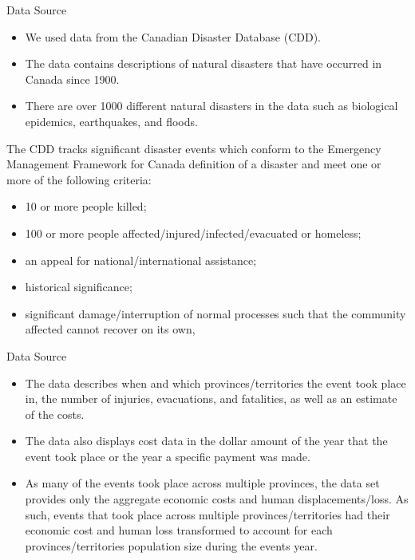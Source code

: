 \begin{frame}{Data Source}
\begin{itemize}
	\item We used data from the Canadian Disaster Database (CDD).  
	\item The data contains descriptions of natural disasters that have occurred in Canada since 1900. 
	\item There are over 1000 different natural disasters in the data such as biological epidemics, earthquakes, and floods.
\end{itemize}
The CDD tracks significant disaster events which conform to the Emergency Management Framework for Canada definition of a disaster and meet one or more of the following criteria:
\begin{itemize}
	\item 10 or more people killed;
	\item 100 or more people affected/injured/infected/evacuated or homeless;
	\item an appeal for national/international assistance;
	\item historical significance;
	\item significant damage/interruption of normal processes such that the community affected cannot recover on its own,
\end{itemize}
\end{frame}

\begin{frame}{Data Source}
\begin{itemize}
	\item The data describes when and which provinces/territories the event took place in, the number of injuries, evacuations, and fatalities, as well as an estimate of the costs. 
	\item The data also displays cost data in the dollar amount of the year that the event took place or the year a specific payment was made.
	\item As many of the events took place across multiple provinces, the data set provides only the aggregate economic costs and human displacements/loss. As such, events that took place across multiple provinces/territories had their economic cost and human loss transformed to account for each provinces/territories population size during the events year. 

\end{itemize}
\end{frame}

